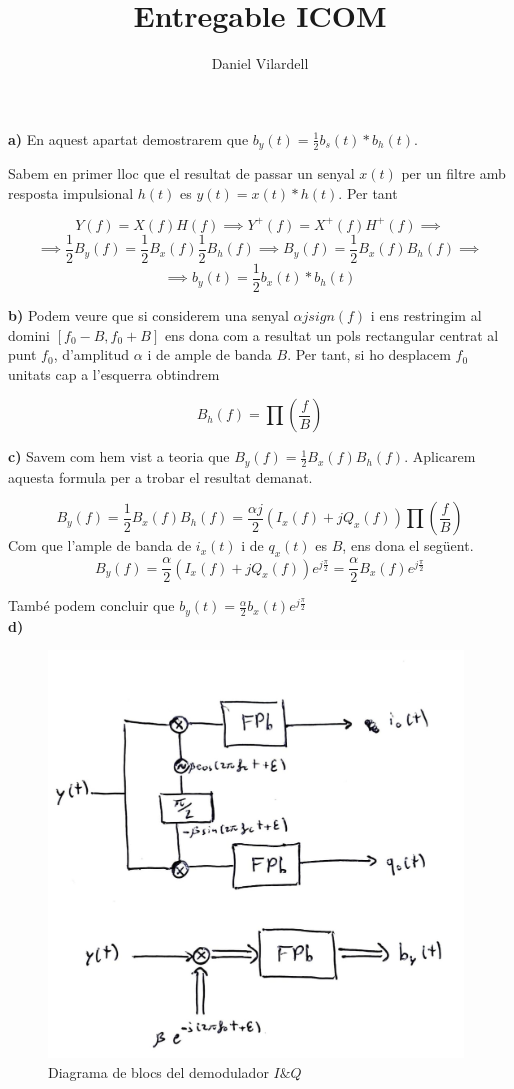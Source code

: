 \documentclass[12pt, a4papre]{article}
\author{Daniel Vilardell}
\title{Entregable ICOM}
\date{}
\begin{document}
	\maketitle
	\textbf{a)} En aquest apartat demostrarem que $b_y(t) = \frac{1}{2} b_s(t)  * b_h(t)$.
	
	Sabem en primer lloc que el resultat de passar un senyal $x(t)$ per un filtre amb resposta impulsional $h(t)$ es $y(t) = x(t)*h(t)$. Per tant
	
	\[
		Y(f) = X(f)H(f) \implies Y^+(f) = X^+(f)H^+(f) \implies
	\]
	\[
		\implies \frac{1}{2} B_y(f)= \frac{1}{2}B_x(f)\frac{1}{2}B_h(f) \implies B_y(f)= \frac{1}{2}B_x(f)B_h(f) \implies
	\]
	\[
		\implies b_y(t) = \frac{1}{2}b_x(t)*b_h(t)
	\]
	
	
	\textbf{b)} Podem veure que si considerem una senyal $\alpha j sign(f)$ i ens restringim al domini $ [f_0 - B, f_0 + B]$ ens dona com a resultat un pols rectangular centrat al punt $f_0$, d'amplitud $\alpha$ i de ample de banda $B$. Per tant, si ho desplacem $f_0$ unitats cap a l'esquerra obtindrem
	
	\[
		B_h(f) = \prod\left(\frac{f}{B}\right)
	\]
	
	\textbf{c)} Savem com hem vist a teoria que $B_y(f) = \frac{1}{2}B_x(f)B_h(f)$. Aplicarem aquesta formula per a trobar el resultat demanat.
	
	\[
		B_y(f) = \frac{1}{2}B_x(f)B_h(f) = \frac{\alpha j}{2} (I_x(f) + jQ_x(f)) \prod\left(\frac{f}{B}\right)
	\]
	Com que l'ample de banda de $i_x(t)$ i de $q_x(t)$ es $B$, ens dona el següent.
	\[
		B_y(f) = \frac{\alpha}{2} (I_x(f) + jQ_x(f))e^{j\frac{\pi}{2}} = \frac{\alpha}{2}B_x(f)e^{j\frac{\pi}{2}}
	\]
	
	També podem concluir que $b_y(t) =  \frac{\alpha}{2}b_x(t)e^{j\frac{\pi}{2}}$
	\\
	
	\textbf{d)} 
	
	\begin{figure}[H]
		\begin{center}
		\includegraphics[width=110mm]{Entr1.jpeg}
		\caption{Diagrama de blocs del demodulador $I\&Q$}
		\end{center}
	\end{figure}
	
\end{document}
